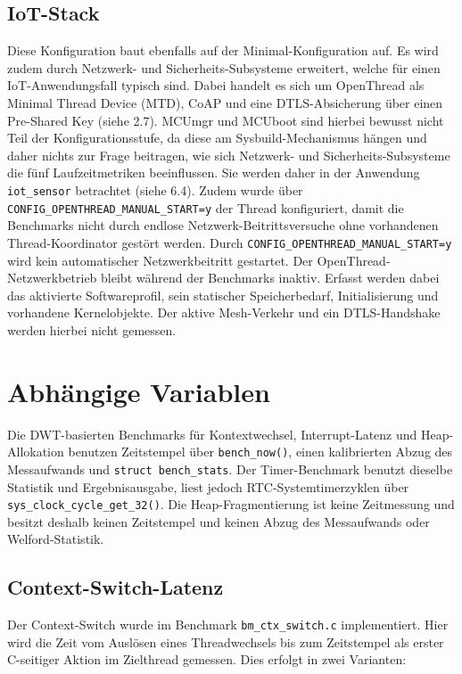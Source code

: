 \subsection{IoT-Stack}
Diese Konfiguration baut ebenfalls auf der Minimal-Konfiguration auf. Es wird zudem durch Netzwerk- und Sicherheits-Subsysteme erweitert, welche f{\"u}r einen IoT-Anwendungsfall typisch sind. Dabei handelt es sich um OpenThread als Minimal Thread Device (MTD), CoAP und eine DTLS-Absicherung {\"u}ber einen Pre-Shared Key (siehe 2.7). MCUmgr und MCUboot sind hierbei bewusst nicht Teil der Konfigurationsstufe, da diese am Sysbuild-Mechanismus h{\"a}ngen und daher nichts zur Frage beitragen, wie sich Netzwerk- und Sicherheits-Subsysteme die f{\"u}nf Laufzeitmetriken beeinflussen. Sie werden daher in der Anwendung \lstinline[style=fileinline]|iot_sensor| betrachtet (siehe 6.4). Zudem wurde {\"u}ber \lstinline[style=fileinline]|CONFIG_OPENTHREAD_MANUAL_START=y| der Thread konfiguriert, damit die Benchmarks nicht durch endlose Netzwerk-Beitrittsversuche ohne vorhandenen Thread-Koordinator gest{\"o}rt werden. Durch \lstinline[style=fileinline]|CONFIG_OPENTHREAD_MANUAL_START=y| wird kein automatischer Netzwerkbeitritt gestartet. Der OpenThread-Netzwerkbetrieb bleibt w{\"a}hrend der Benchmarks inaktiv. Erfasst werden dabei das aktivierte Softwareprofil, sein statischer Speicherbedarf, Initialisierung und vorhandene Kernelobjekte. Der aktive Mesh-Verkehr und ein DTLS-Handshake werden hierbei nicht gemessen.

\section{Abh{\"a}ngige Variablen}
Die DWT-basierten Benchmarks f{\"u}r Kontextwechsel, Interrupt-Latenz und Heap-Allokation benutzen Zeitstempel {\"u}ber \lstinline[style=fileinline]|bench_now()|, einen kalibrierten Abzug des Messaufwands und \lstinline[style=fileinline]|struct bench_stats|. Der Timer-Benchmark benutzt dieselbe Statistik und Ergebnisausgabe, liest jedoch RTC-Systemtimerzyklen {\"u}ber \lstinline[style=fileinline]|sys_clock_cycle_get_32()|. Die Heap-Fragmentierung ist keine Zeitmessung und besitzt deshalb keinen Zeitstempel und keinen Abzug des Messaufwands oder Welford-Statistik.

\subsection{Context-Switch-Latenz}
Der Context-Switch wurde im Benchmark \lstinline[style=fileinline]|bm_ctx_switch.c| implementiert. Hier wird die Zeit vom Ausl{\"o}sen eines Threadwechsels bis zum Zeitstempel als erster C-seitiger Aktion im Zielthread gemessen. Dies erfolgt in zwei Varianten:

